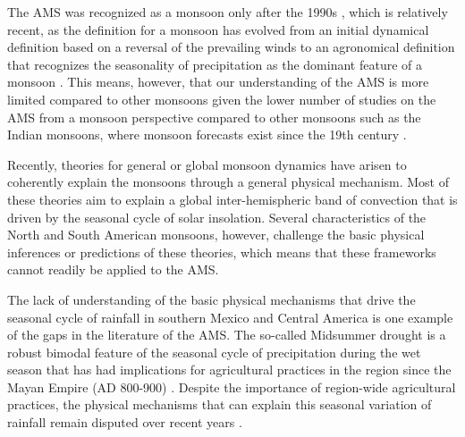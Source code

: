 The AMS was recognized as a monsoon only after the 1990s , which is relatively recent, as the definition for a monsoon has evolved from an initial dynamical definition based on a reversal of the prevailing winds to an agronomical definition that recognizes the seasonality of precipitation as the dominant feature of a monsoon \citep{wang2017,gadgil2018}. This  means, however, that our understanding of the AMS is more limited compared to other monsoons given the lower number of studies on the AMS from a monsoon perspective compared to other monsoons such as the Indian monsoons, where monsoon forecasts exist since the 19th century \citep{blanford}.

Recently, theories for general or global monsoon dynamics \citep{bordoni2008monsoons,biasutti2018global,hill2019,geen2020} have arisen to coherently explain the monsoons through a general physical mechanism. Most of these theories aim to explain a global inter-hemispheric band of convection that is driven by the seasonal cycle of solar insolation. Several characteristics of the North and South American monsoons, however, challenge the basic physical inferences or predictions of these theories, which means that these frameworks cannot readily  be applied to the AMS.%


The lack of understanding of the basic physical mechanisms that drive the seasonal cycle of rainfall in southern Mexico and Central America is one example of the gaps in the literature of the AMS. The so-called Midsummer drought is a robust bimodal feature of the seasonal cycle of precipitation during the wet season that has had implications for agricultural practices in the region since the Mayan Empire (AD 800-900) \citep{jobbova2018ritual}. Despite the importance of region-wide agricultural practices, the physical mechanisms that can explain this seasonal variation of rainfall remain disputed over recent years \citep{karnauskas2013,herrera2015,zermeno2019}. 


